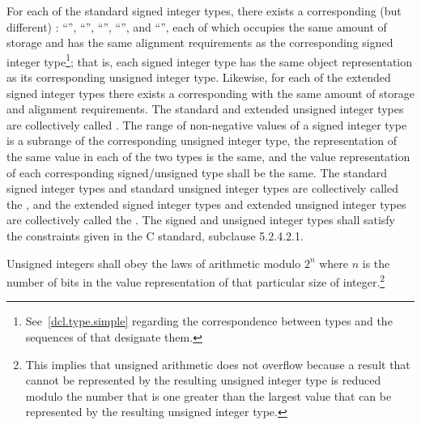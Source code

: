 \pnum
{}%
For each of the standard signed integer types,
there exists a corresponding (but different)
%
:
%
%
%
%
%
``'', ``'',
``'', ``'', and
``'', each of
which occupies the same amount of storage and has the same alignment
requirements as the corresponding signed integer
type\footnote{See~\ref{dcl.type.simple} regarding the correspondence between types and
the sequences of  that designate them.};
that is, each signed integer type has the same object representation as
its corresponding unsigned integer type.
%
%
Likewise, for each of the extended signed integer types there exists a
corresponding
 with the same amount of storage and alignment
requirements. The standard and extended unsigned integer types are
collectively called . The range of non-negative
values of a signed integer type is
a subrange of the corresponding unsigned integer type,
the representation of the same value in each of the two types is the same, and
the value representation of each corresponding signed/unsigned type shall be the same.
%
%
The standard signed integer types and standard unsigned integer types
are collectively called the , and the extended
signed integer types and extended
unsigned integer types are collectively called the
.
The signed and unsigned integer types shall satisfy
the constraints given in the C standard, subclause 5.2.4.2.1.

\pnum
{}%
Unsigned integers shall obey the laws of arithmetic modulo $2^n$ where $n$ is
the number of bits in the value representation of that particular size of
integer.\footnote{This implies that
unsigned arithmetic does not overflow because a result
that cannot be represented by the resulting unsigned integer type is
reduced modulo the number that is one greater than the largest value
that can be represented by the resulting unsigned integer type.}


